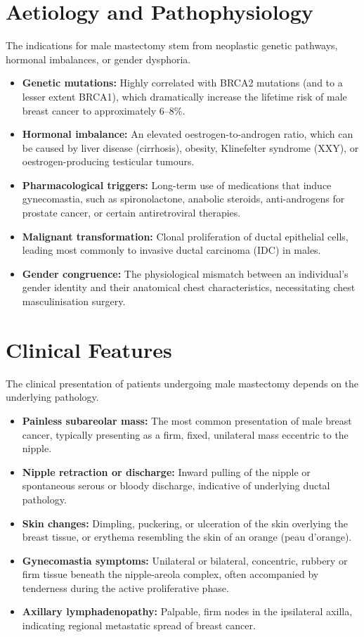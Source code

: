 \section*{Aetiology and Pathophysiology}
The indications for male mastectomy stem from neoplastic genetic pathways, hormonal imbalances, or gender dysphoria.
\begin{itemize}
    \item \textbf{Genetic mutations:} Highly correlated with BRCA2 mutations (and to a lesser extent BRCA1), which dramatically increase the lifetime risk of male breast cancer to approximately 6--8\%.
    \item \textbf{Hormonal imbalance:} An elevated oestrogen-to-androgen ratio, which can be caused by liver disease (cirrhosis), obesity, Klinefelter syndrome (XXY), or oestrogen-producing testicular tumours.
    \item \textbf{Pharmacological triggers:} Long-term use of medications that induce gynecomastia, such as spironolactone, anabolic steroids, anti-androgens for prostate cancer, or certain antiretroviral therapies.
    \item \textbf{Malignant transformation:} Clonal proliferation of ductal epithelial cells, leading most commonly to invasive ductal carcinoma (IDC) in males.
    \item \textbf{Gender congruence:} The physiological mismatch between an individual's gender identity and their anatomical chest characteristics, necessitating chest masculinisation surgery.
\end{itemize}

\section*{Clinical Features}
The clinical presentation of patients undergoing male mastectomy depends on the underlying pathology.
\begin{itemize}
    \item \textbf{Painless subareolar mass:} The most common presentation of male breast cancer, typically presenting as a firm, fixed, unilateral mass eccentric to the nipple.
    \item \textbf{Nipple retraction or discharge:} Inward pulling of the nipple or spontaneous serous or bloody discharge, indicative of underlying ductal pathology.
    \item \textbf{Skin changes:} Dimpling, puckering, or ulceration of the skin overlying the breast tissue, or erythema resembling the skin of an orange (peau d'orange).
    \item \textbf{Gynecomastia symptoms:} Unilateral or bilateral, concentric, rubbery or firm tissue beneath the nipple-areola complex, often accompanied by tenderness during the active proliferative phase.
    \item \textbf{Axillary lymphadenopathy:} Palpable, firm nodes in the ipsilateral axilla, indicating regional metastatic spread of breast cancer.
\end{itemize}

